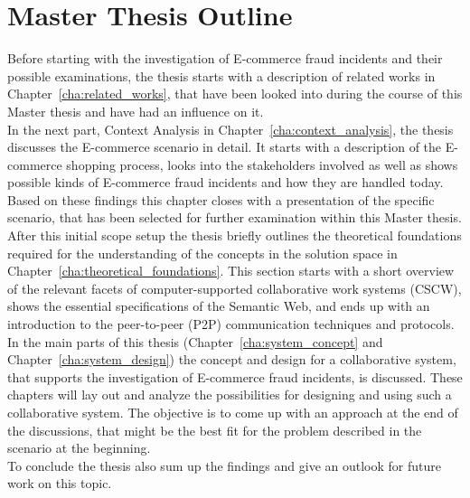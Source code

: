 
\section{Master Thesis Outline}
\label{sec:thesis_outline}

Before starting with the investigation of \gls{E-commerce} fraud incidents and their possible examinations, the thesis starts with a description of related works in Chapter~\ref{cha:related_works}, that have been looked into during the course of this Master thesis and have had an influence on it. \\

In the next part, Context Analysis in Chapter~\ref{cha:context_analysis}, the thesis discusses the \gls{E-commerce} scenario in detail. It starts with a description of the \gls{E-commerce} shopping process, looks into the stakeholders involved as well as shows possible kinds of \gls{E-commerce} fraud incidents and how they are handled today. Based on these findings this chapter closes with a presentation of the specific scenario, that has been selected for further examination within this Master thesis. \\

After this initial scope setup the thesis briefly outlines the theoretical foundations required for the understanding of the concepts in the solution space in Chapter~\ref{cha:theoretical_foundations}. This section starts with a short overview of the relevant facets of computer-supported collaborative work systems (\gls{CSCW}), shows the essential specifications of the Semantic Web, and ends up with an introduction to the peer-to-peer (\gls{P2P}) communication techniques and protocols. \\

In the main parts of this thesis (Chapter~\ref{cha:system_concept} and Chapter~\ref{cha:system_design}) the concept and design for a collaborative system, that supports the investigation of \gls{E-commerce} fraud incidents, is discussed. These chapters will lay out and analyze the possibilities for designing and using such a collaborative system. The objective is to come up with an approach at the end of the discussions, that might be the best fit for the problem described in the scenario at the beginning. \\

To conclude the thesis also sum up the findings and give an outlook for future work on this topic.


